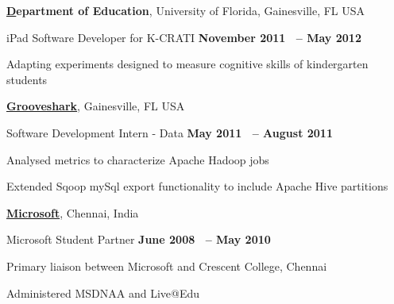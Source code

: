 \documentclass[10pt]{article}
\renewcommand\textit[1]{#1}
\newenvironment{outerlist}[1][\enskip\textbullet]%
        {\begin{itemize}[#1]}{\end{itemize}%
         \vspace{-.6\baselineskip}}
\newenvironment{innerlist}[1][\enskip\textbullet]%
        {\begin{compactitem}[#1]}{\end{compactitem}}
\newcommand{\halfblankline}{\quad\vspace{-0.5\baselineskip}\pagebreak[3]}
\begin{document}
\halfblankline

\textbf{\href{http://www.ufl.edu/}Department of Education},
University of Florida, Gainesville, FL USA
\begin{outerlist}

\item[] \textit{iPad Software Developer for K-CRATI}%
        \hfill \textbf{November 2011 ~-- May 2012}
\begin{innerlist}
\item Adapting experiments designed to measure cognitive skills of kindergarten students
\end{innerlist}

\end{outerlist}

\halfblankline

\href{http://www.grooveshark.com/}{\textbf{Grooveshark}},
Gainesville, FL USA
\begin{outerlist}

\item[] \textit{ Software Development Intern - Data}%
        \hfill \textbf{May 2011 ~-- August 2011}
\begin{innerlist}
\item Analysed metrics to characterize Apache Hadoop jobs
\item Extended Sqoop mySql export functionality to include Apache Hive partitions
\end{innerlist}

\end{outerlist}

\halfblankline


\href{http://www.microsoft.com/}{\textbf{Microsoft}},
Chennai, India
\begin{outerlist}

\item[] \textit{Microsoft Student Partner}%
        \hfill \textbf{June 2008 ~-- May 2010}
\begin{innerlist}
\item Primary liaison between Microsoft and Crescent College, Chennai
\item Administered MSDNAA and Live@Edu
\end{innerlist}

\end{outerlist}

\halfblankline
\end{document}
